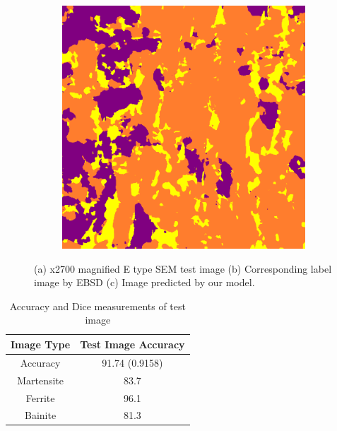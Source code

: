 \documentclass[]{article}
\begin{document}
\begin{figure}[ht]
\begin{subfigure}[b]{0.3\textwidth}
		\caption{}
		\label{fig:samesteelsamemag-label}
	\end{subfigure}
	\hfill
	\begin{subfigure}[b]{0.3\textwidth}
		\centering
		\includegraphics[width=\textwidth]{images/inference/SameSteelSameMag-P.png}
		\caption{}
		\label{fig:samesteelsamemag-pred}
	\end{subfigure}
	
	\caption{(a) x2700 magnified E type SEM test image (b) Corresponding label image by EBSD (c) Image predicted by our model.}
	\label{fig:samesteelsamemag}
\end{figure}



\begin{table}[h!]
	\centering
	\begin{tabular}{|c|c|}
		\hline
		\textbf{Image Type} & \textbf{Test Image Accuracy}\\
		\hline
		Accuracy & 91.74 (0.9158) \\
		\hline
		Martensite & 83.7 \\
		Ferrite & 96.1 \\
		Bainite & 81.3 \\
		\hline
	\end{tabular}
	\caption{Accuracy and Dice measurements of test image}
\end{table}
\end{document}
